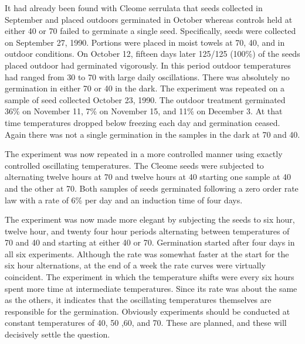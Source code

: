 It had already been found with Cleome serrulata that seeds collected in
September and placed outdoors germinated in October whereas controls held at
either 40 or 70 failed to germinate a single seed. Specifically, seeds were collected
on September 27, 1990. Portions were placed in moist towels at 70, 40, and in
outdoor conditions. On October 12, fifteen days later 125/125 (100\%) of the seeds
placed outdoor had germinated vigorously. In this period outdoor temperatures had
ranged from 30 to 70 with large daily oscillations. There was absolutely no
germination in either 70 or 40 in the dark. The experiment was repeated on a sample
of seed collected October 23, 1990. The outdoor treatment germinated 36\% on
November 11, 7\% on November 15, and 11\% on December 3. At that time
temperatures dropped below freezing each day and germination ceased. Again there
was not a single germination in the samples in the dark at 70 and 40.

The experiment was now repeated in a more controlled manner using exactly
controlled oscillating temperatures. The Cleome seeds were subjected to alternating
twelve hours at 70 and twelve hours at 40 starting one sample at 40 and the other at
70. Both samples of seeds germinated following a zero order rate law with a rate of
6\% per day and an induction time of four days.

The experiment was now made more elegant by subjecting the seeds to six
hour, twelve hour, and twenty four hour periods alternating between temperatures of
70 and 40 and starting at either 40 or 70. Germination started after four days in all six
experiments. Although the rate was somewhat faster at the start for the six hour
alternations, at the end of a week the rate curves were virtually coincident. The
experiment in which the temperature shifts were every six hours spent more time at
intermediate temperatures. Since its rate was about the same as the others, it
indicates that the oscillating temperatures themselves are responsible for the
germination. Obviously experiments should be conducted at constant temperatures of
40, 50 ,60, and 70. These are planned, and these will decisively settle the question.

